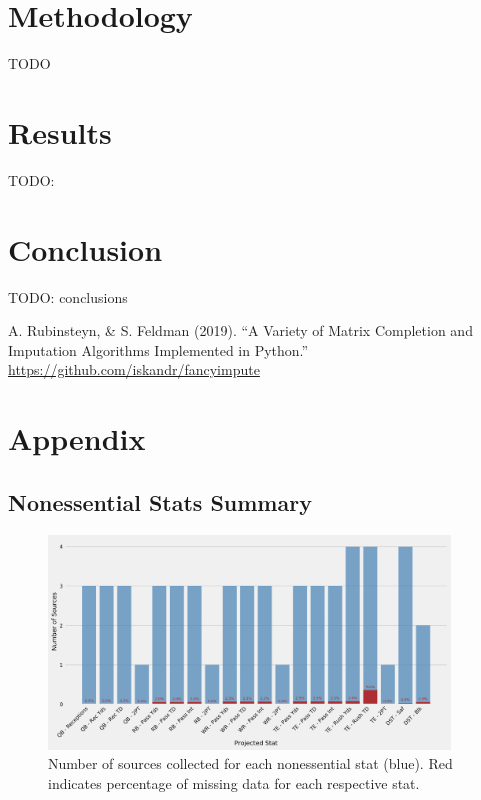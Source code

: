 \documentclass[12pt]{article}
\begin{document}
\pagebreak
\section{Methodology}
TODO



\pagebreak
\section{Results}
TODO: 



\pagebreak
\section{Conclusion}
TODO: conclusions


\pagebreak
\begin{thebibliography}{}

A. Rubinsteyn, \& S. Feldman (2019). 
``A Variety of Matrix Completion and Imputation Algorithms Implemented in Python.'' \url{https://github.com/iskandr/fancyimpute}





\end{thebibliography}

\pagebreak
\section{Appendix}
\subsection{Nonessential Stats Summary}

\begin{figure}[H]
  \centering
  \includegraphics[width=0.95\textwidth]{../figures/nonessential_missing_data}
  \caption{Number of sources collected for each nonessential stat (blue). Red  indicates percentage of missing data for each respective stat.}
\end{figure}
\end{document}

